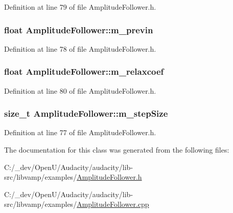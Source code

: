 Definition at line 79 of file Amplitude\+Follower.\+h.

\subsubsection[{\texorpdfstring{m\+\_\+previn}{m_previn}}]{\setlength{\rightskip}{0pt plus 5cm}float Amplitude\+Follower\+::m\+\_\+previn\hspace{0.3cm}{\ttfamily [protected]}}\hypertarget{class_amplitude_follower_ac95e8d2f334821c6c92c706bae29695a}{}\label{class_amplitude_follower_ac95e8d2f334821c6c92c706bae29695a}


Definition at line 78 of file Amplitude\+Follower.\+h.

\subsubsection[{\texorpdfstring{m\+\_\+relaxcoef}{m_relaxcoef}}]{\setlength{\rightskip}{0pt plus 5cm}float Amplitude\+Follower\+::m\+\_\+relaxcoef\hspace{0.3cm}{\ttfamily [protected]}}\hypertarget{class_amplitude_follower_aceecd3b3879f32eb4a2e597c32c41cfc}{}\label{class_amplitude_follower_aceecd3b3879f32eb4a2e597c32c41cfc}


Definition at line 80 of file Amplitude\+Follower.\+h.

\subsubsection[{\texorpdfstring{m\+\_\+step\+Size}{m_stepSize}}]{\setlength{\rightskip}{0pt plus 5cm}size\+\_\+t Amplitude\+Follower\+::m\+\_\+step\+Size\hspace{0.3cm}{\ttfamily [protected]}}\hypertarget{class_amplitude_follower_a959c2647fd3c5feea2591e3618774027}{}\label{class_amplitude_follower_a959c2647fd3c5feea2591e3618774027}


Definition at line 77 of file Amplitude\+Follower.\+h.



The documentation for this class was generated from the following files\+:\begin{DoxyCompactItemize}
\item 
C\+:/\+\_\+dev/\+Open\+U/\+Audacity/audacity/lib-\/src/libvamp/examples/\hyperlink{_amplitude_follower_8h}{Amplitude\+Follower.\+h}\item 
C\+:/\+\_\+dev/\+Open\+U/\+Audacity/audacity/lib-\/src/libvamp/examples/\hyperlink{_amplitude_follower_8cpp}{Amplitude\+Follower.\+cpp}\end{DoxyCompactItemize}
